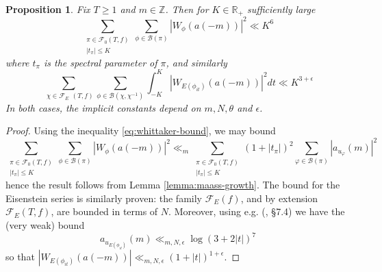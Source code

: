 \documentclass{article}
\newtheorem{proposition}[theorem]{Proposition}
\numberwithin{equation}{section}
\begin{document}
\begin{proposition}\label{prop:whittaker-growth-2}
    Fix $T \geq 1$ and $m \in \mathbb{Z}$. Then for $K \in \mathbb{R}_+$ sufficiently large
    \begin{equation}
        \sum_{\substack{\pi \in \mathcal{F}_{0}(T,f)\\ |t_\pi|\leq K}}\sum_{\phi \in \mathcal{B}(\pi)}|W_\phi(a(-m))|^2 \ll K^{6}
    \end{equation}
    where $t_\pi$ is the spectral parameter of $\pi$, and similarly
    \begin{equation}
        \sum_{\substack{\chi \in \mathcal{F}_E}(T,f)}\sum_{\phi \in \mathcal{B}(\chi,\chi^{-1})}\int_{-K}^K |W_{E(\phi_{it})}(a(-m))|^2 dt \ll K^{3+\epsilon}
    \end{equation}
    In both cases, the implicit constants depend on $m,N, \theta$ and $\epsilon$. 
\end{proposition}
\begin{proof}
    Using the inequality \eqref{eq:whittaker-bound}, we may bound
    $$ \sum_{\substack{\pi \in \mathcal{F}_{0}(T,f)\\ |t_\pi|\leq K}}\sum_{\phi \in \mathcal{B}(\pi)}|W_\phi(a(-m))|^2 \ll_m\sum _{\substack{\pi \in \mathcal{F}_{0}(T,f)\\ |t_\pi|\leq K}}(1+|t_\pi|)^2\sum_{\varphi \in \mathcal{B}(\pi)}|a_{u_\varphi}(m)|^2$$
    hence the result follows from Lemma \ref{lemma:maass-growth}. The bound for the Eisenstein series is similarly proven: the family $\mathcal{F}_E(f)$, and by extension $\mathcal{F}_E(T,f)$, are bounded in terms of $N$. Moreover, using e.g. (\cite{KL-kuznetsov}, \S 7.4) we have the (very weak) bound
    \begin{equation*}
        a_{u_{E(\phi_{it})}}(m)\ll_{m,N,\epsilon} \log(3+2|t|)^7
    \end{equation*}
    so that $|W_{E(\phi_{it})}(a(-m))|\ll_{m,N,\epsilon} (1+|t|)^{1+\epsilon}$.
\end{proof}
\end{document}
